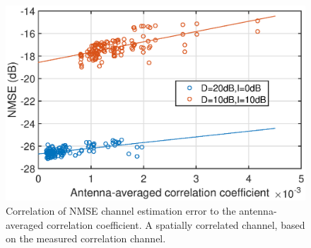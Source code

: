 \begin{figure}[t!]
	\centering
	\includegraphics[width=1.0\linewidth]{figures/NMSE_correlation_measured_collocated.eps}
	\caption{Correlation of NMSE channel estimation error to the antenna-averaged correlation coefficient. A spatially correlated channel, based on
the measured correlation channel.}
	\label{fig:channel_correlation_measured}
\end{figure}


